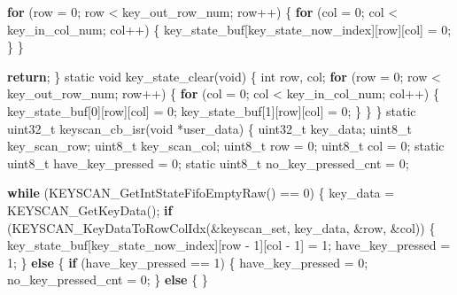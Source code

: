\documentclass[
  12pt,
]{book}
\newenvironment{Shaded}{\begin{snugshade}}{\end{snugshade}}
\newcommand{\ControlFlowTok}[1]{\textcolor[rgb]{0.13,0.29,0.53}{\textbf{#1}}}
\newcommand{\DataTypeTok}[1]{\textcolor[rgb]{0.13,0.29,0.53}{#1}}
\newcommand{\DecValTok}[1]{\textcolor[rgb]{0.00,0.00,0.81}{#1}}
\newcommand{\NormalTok}[1]{#1}
\begin{document}
\begin{Shaded}
\begin{Highlighting}[]
{    \ControlFlowTok{for}\NormalTok{ (row = }\DecValTok{0}\NormalTok{; row < key_out_row_num; row++) \{}
        \ControlFlowTok{for}\NormalTok{ (col = }\DecValTok{0}\NormalTok{; col < key_in_col_num; col++) \{}
\NormalTok{            key_state_buf[key_state_now_index][row][col] = }\DecValTok{0}\NormalTok{;}
\NormalTok{        \}}
\NormalTok{    \}}

    \ControlFlowTok{return}\NormalTok{;}
\NormalTok{\}}
\DataTypeTok{static} \DataTypeTok{void}\NormalTok{ key_state_clear(}\DataTypeTok{void}\NormalTok{)}
\NormalTok{\{}
    \DataTypeTok{int}\NormalTok{ row, col;}
    \ControlFlowTok{for}\NormalTok{ (row = }\DecValTok{0}\NormalTok{; row < key_out_row_num; row++) \{}
        \ControlFlowTok{for}\NormalTok{ (col = }\DecValTok{0}\NormalTok{; col < key_in_col_num; col++) \{}
\NormalTok{            key_state_buf[}\DecValTok{0}\NormalTok{][row][col] = }\DecValTok{0}\NormalTok{;}
\NormalTok{            key_state_buf[}\DecValTok{1}\NormalTok{][row][col] = }\DecValTok{0}\NormalTok{;}
\NormalTok{        \}}
\NormalTok{    \}}
\NormalTok{\}}
\DataTypeTok{static} \DataTypeTok{uint32_t}\NormalTok{ keyscan_cb_isr(}\DataTypeTok{void}\NormalTok{ *user_data)}
\NormalTok{\{}
    \DataTypeTok{uint32_t}\NormalTok{ key_data;}
    \DataTypeTok{uint8_t}\NormalTok{ key_scan_row;}
    \DataTypeTok{uint8_t}\NormalTok{ key_scan_col;}
    \DataTypeTok{uint8_t}\NormalTok{ row = }\DecValTok{0}\NormalTok{;}
    \DataTypeTok{uint8_t}\NormalTok{ col = }\DecValTok{0}\NormalTok{;}
    \DataTypeTok{static} \DataTypeTok{uint8_t}\NormalTok{ have_key_pressed = }\DecValTok{0}\NormalTok{;}
    \DataTypeTok{static} \DataTypeTok{uint8_t}\NormalTok{ no_key_pressed_cnt = }\DecValTok{0}\NormalTok{;}

    \ControlFlowTok{while}\NormalTok{ (KEYSCAN_GetIntStateFifoEmptyRaw() == }\DecValTok{0}\NormalTok{) \{}
\NormalTok{        key_data = KEYSCAN_GetKeyData();}
        \ControlFlowTok{if}\NormalTok{ (KEYSCAN_KeyDataToRowColIdx(&keyscan_set, key_data, &row, &col)) \{}
\NormalTok{            key_state_buf[key_state_now_index][row - }\DecValTok{1}\NormalTok{][col - }\DecValTok{1}\NormalTok{] = }\DecValTok{1}\NormalTok{;}
\NormalTok{            have_key_pressed = }\DecValTok{1}\NormalTok{;}
\NormalTok{        \} }\ControlFlowTok{else}\NormalTok{ \{}
            \ControlFlowTok{if}\NormalTok{ (have_key_pressed == }\DecValTok{1}\NormalTok{) \{}
\NormalTok{                have_key_pressed = }\DecValTok{0}\NormalTok{;}
\NormalTok{                no_key_pressed_cnt = }\DecValTok{0}\NormalTok{;}
\NormalTok{            \} }\ControlFlowTok{else}\NormalTok{ \{}
\NormalTok{            \}}

}
\end{Highlighting}
\end{Shaded}
\end{document}
